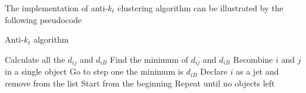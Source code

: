 %
%
%
%
%


The implementation of anti-$k_t$ clustering algorithm can be illustrated by the following pseudocode
\begin{algorithm}
\caption{Anti-$k_{t}$ algorithm}
\begin{algorithmic}
\State Calculate all the $d_{ij}$ and $d_{iB}$
\State Find the minimum of $d_{ij}$ and $d_{iB}$ 
	\State Recombine $i$ and $j$ in a single object 
	\State Go to step one
\Else \State the minimum is $d_{iB}$
	\State Declare $i$ as a jet and remove from the list
	\State Start from the beginning	
\EndIf
\State Repeat until no objects left 
\end{algorithmic}
\end{algorithm}

